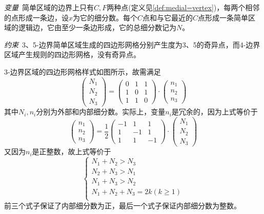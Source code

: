 \emph{变量}\, 简单区域的边界上只有$C,F$两种点(定义见\ref{def:medial=vertex})，每两个相邻的点形成一条边，设$x$为它的细分数。每个$C$点和与它最近的$C$点形成一条简单区域的逻辑边，它由至少一条边形成，它的总细分数记为$N$。

\emph{约束}\, 3、5-边界简单区域生成的四边形网格分别产生度为3、5的奇异点，而4-边界区域产生规则的四边形网格，没有奇异点。

3-边界区域的四边形网格样式如图所示，故需满足
\begin{equation}
\left(
\begin{array}{c}
N_1 \\ 
N_2 \\ 
N_3
\end{array}
\right) 
=
\left(
\begin{array}{ccc}
0 & 1 & 1 \\ 
1 & 0 & 1 \\ 
1 & 1 & 0
\end{array}
\right)
\cdot
\left(
\begin{array}{c}
n_1 \\ 
n_2 \\ 
n_3
\end{array} 
\right)
\end{equation}
其中$N_i,n_i$分别为外部和内部细分数。实际上，变量$n_i$是冗余的，因为上式等价于
\begin{equation}
\left(
\begin{array}{c}
n_1 \\ 
n_2 \\ 
n_3
\end{array} 
\right)
=
\frac{1}{2}
\left(
\begin{array}{ccc}
-1 & 1 & 1 \\ 
1 & -1 & 1 \\ 
1 & 1 & -1
\end{array}
\right)
\cdot
\left(
\begin{array}{c}
N_1 \\ 
N_2 \\ 
N_3
\end{array}
\right) 
\end{equation}
又因为$n_i$是正整数，故上式等价于
 \begin{equation}        \label{equ:3side}                  
 \begin{cases}
 N_1+N_2>N_3\\
 N_2+N_3>N_1\\
 N_1+N_3>N_2\\
 N_1+N_2+N_3=2k(k\geq 1)\\
 \end{cases}
 \end{equation}
 前三个式子保证了内部细分数为正，最后一个式子保证内部细分数为整数。
 
